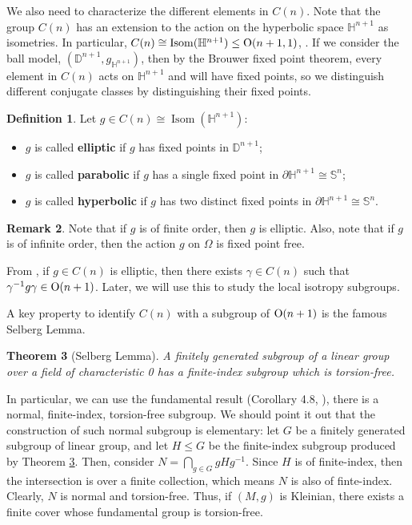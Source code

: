 \documentclass[12pt]{amsart}
\newtheorem{theorem}{Theorem}[section]
\theoremstyle{definition}
\newtheorem{definition}[theorem]{Definition}
\newtheorem{remark}[theorem]{Remark}
\begin{document}
We also need to characterize the different elements in $C(n)$. Note that the group $C(n)$ has an extension to the action on the hyperbolic space $\mathbb{H}^{n+1}$ as isometries. In particular, $C(n)\cong\operatorname{Isom}(\mathbb{H}^{n+1})\leq {\rm{O}}(n+1,1)$, \cite{conformalbook}. If we consider the ball model, $(\mathbb{D}^{n+1},g_{\mathbb{H}^{n+1}})$, then by the Brouwer fixed point theorem, every element in $C(n)$ acts on $\mathbb{H}^{n+1}$ and will have fixed points, so we distinguish different conjugate classes by distinguishing their fixed points.
\begin{definition}\label{conjugate class}\cite{conformalbook}
    Let $g\in C(n)\cong \operatorname{Isom}(\mathbb{H}^{n+1})$:
    \begin{itemize}
            \item $g$ is called \textbf{elliptic} if $g$ has fixed points in $\mathbb{D}^{n+1}$;
            \item $g$ is called \textbf{parabolic} if $g$ has a single fixed point in $\partial\mathbb{H}^{n+1}\cong\mathbb{S}^n$;
            \item $g$ is called \textbf{hyperbolic} if $g$ has two distinct fixed points in $\partial\mathbb{H}^{n+1}\cong\mathbb{S}^n$.
    \end{itemize}
\end{definition}

\begin{remark}\label{elliptic}
     Note that if $g$ is of finite order, then $g$ is elliptic. Also, note that if $g$ is of infinite order, then the action $g$ on $\Omega$ is fixed point free.
\end{remark}


From \cite{conformalbook}, if $g\in C(n)$ is elliptic, then there exists $\gamma\in C(n)$ such that $\gamma^{-1} g\gamma\in {\rm{O}}(n+1)$. Later, we will use this to study the local isotropy subgroups.

A key property to identify $C(n)$ with a subgroup of ${\rm{O}}(n+1)$ is the famous Selberg Lemma.
\begin{theorem}[Selberg Lemma]\label{theorem.selberg}
    A finitely generated subgroup of a linear group over a field of characteristic 0 has a finite-index subgroup which is torsion-free.
\end{theorem}
In particular, we can use the fundamental result (Corollary 4.8, \cite{wehrfritz2012infinite}), there is a normal, finite-index, torsion-free subgroup. We should point it out that the construction of such normal subgroup is elementary: let $G$ be a finitely generated subgroup of linear group, and let $H\leq G$ be the finite-index subgroup produced by Theorem \ref{theorem.selberg}. Then, consider $N=\bigcap_{g \in G} g H g^{-1}$. Since $H$ is of finite-index, then the intersection is over a finite collection, which means $N$ is also of finte-index. Clearly, $N$ is normal and torsion-free. Thus, if $(M,g)$ is Kleinian, there exists a finite cover whose fundamental group is torsion-free.
\end{document}

